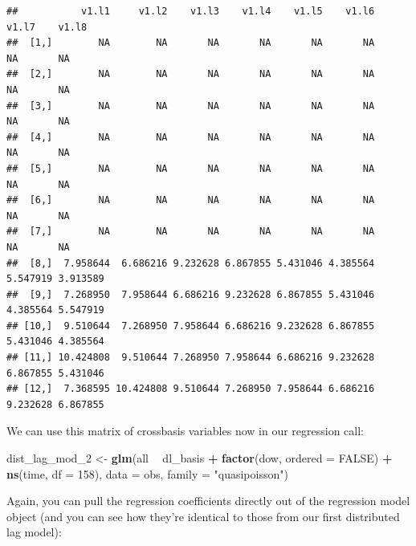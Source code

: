 \documentclass[
]{book}
\newenvironment{Shaded}{\begin{snugshade}}{\end{snugshade}}
\newcommand{\DataTypeTok}[1]{\textcolor[rgb]{0.13,0.29,0.53}{#1}}
\newcommand{\DecValTok}[1]{\textcolor[rgb]{0.00,0.00,0.81}{#1}}
\newcommand{\KeywordTok}[1]{\textcolor[rgb]{0.13,0.29,0.53}{\textbf{#1}}}
\newcommand{\NormalTok}[1]{#1}
\newcommand{\OperatorTok}[1]{\textcolor[rgb]{0.81,0.36,0.00}{\textbf{#1}}}
\newcommand{\OtherTok}[1]{\textcolor[rgb]{0.56,0.35,0.01}{#1}}
\newcommand{\StringTok}[1]{\textcolor[rgb]{0.31,0.60,0.02}{#1}}
\begin{document}
\begin{verbatim}
##           v1.l1     v1.l2    v1.l3    v1.l4    v1.l5    v1.l6    v1.l7    v1.l8
##  [1,]        NA        NA       NA       NA       NA       NA       NA       NA
##  [2,]        NA        NA       NA       NA       NA       NA       NA       NA
##  [3,]        NA        NA       NA       NA       NA       NA       NA       NA
##  [4,]        NA        NA       NA       NA       NA       NA       NA       NA
##  [5,]        NA        NA       NA       NA       NA       NA       NA       NA
##  [6,]        NA        NA       NA       NA       NA       NA       NA       NA
##  [7,]        NA        NA       NA       NA       NA       NA       NA       NA
##  [8,]  7.958644  6.686216 9.232628 6.867855 5.431046 4.385564 5.547919 3.913589
##  [9,]  7.268950  7.958644 6.686216 9.232628 6.867855 5.431046 4.385564 5.547919
## [10,]  9.510644  7.268950 7.958644 6.686216 9.232628 6.867855 5.431046 4.385564
## [11,] 10.424808  9.510644 7.268950 7.958644 6.686216 9.232628 6.867855 5.431046
## [12,]  7.368595 10.424808 9.510644 7.268950 7.958644 6.686216 9.232628 6.867855
\end{verbatim}

We can use this matrix of crossbasis variables now in our regression call:

\begin{Shaded}
\begin{Highlighting}[]
\NormalTok{dist_lag_mod_}\DecValTok{2}\NormalTok{ <-}\StringTok{ }\KeywordTok{glm}\NormalTok{(all }\OperatorTok{~}\StringTok{ }\NormalTok{dl_basis }\OperatorTok{+}\StringTok{ }
\StringTok{                        }\KeywordTok{factor}\NormalTok{(dow, }\DataTypeTok{ordered =} \OtherTok{FALSE}\NormalTok{) }\OperatorTok{+}
\StringTok{                          }\KeywordTok{ns}\NormalTok{(time, }\DataTypeTok{df =} \DecValTok{158}\NormalTok{), }
                        \DataTypeTok{data =}\NormalTok{ obs, }\DataTypeTok{family =} \StringTok{"quasipoisson"}\NormalTok{)}
\end{Highlighting}
\end{Shaded}

Again, you can pull the regression coefficients directly out of the regression model object
(and you can see how they're identical to those from our first distributed lag model):

\begin{Shaded}
\end{Shaded}
\end{document}
